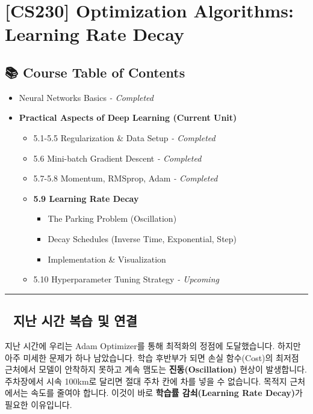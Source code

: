 \documentclass[11pt,a4paper]{book}
\theoremstyle{definition}
\begin{document}
\chapter{[CS230] Optimization Algorithms: \\ Learning Rate Decay}
\label{ch:lecture19}

\section*{📚 Course Table of Contents}
\begin{itemize}
    \item[Chapter 1-4.] Neural Networks Basics \textit{- Completed}
    \item[\textbf{Chapter 5.}] \textbf{Practical Aspects of Deep Learning (Current Unit)}
    \begin{itemize}
        \item 5.1-5.5 Regularization \& Data Setup \textit{- Completed}
        \item 5.6 Mini-batch Gradient Descent \textit{- Completed}
        \item 5.7-5.8 Momentum, RMSprop, Adam \textit{- Completed}
        \item \textbf{5.9 Learning Rate Decay}
        \begin{itemize}
            \item The Parking Problem (Oscillation)
            \item Decay Schedules (Inverse Time, Exponential, Step)
            \item Implementation \& Visualization
        \end{itemize}
        \item 5.10 Hyperparameter Tuning Strategy \textit{- Upcoming}
    \end{itemize}
\end{itemize}

\vspace{0.5cm}
\hrule
\vspace{0.5cm}

\section*{🔗 지난 시간 복습 및 연결}
지난 시간에 우리는 Adam Optimizer를 통해 최적화의 정점에 도달했습니다. 하지만 아주 미세한 문제가 하나 남았습니다. 학습 후반부가 되면 손실 함수(Cost)의 최저점 근처에서 모델이 안착하지 못하고 계속 맴도는 \textbf{진동(Oscillation)} 현상이 발생합니다.
주차장에서 시속 100km로 달리면 절대 주차 칸에 차를 넣을 수 없습니다. 목적지 근처에서는 속도를 줄여야 합니다. 이것이 바로 \textbf{학습률 감쇠(Learning Rate Decay)}가 필요한 이유입니다.
\end{document}
